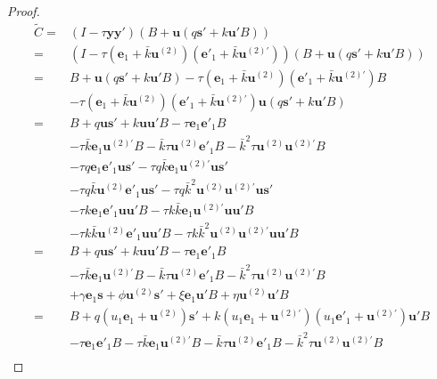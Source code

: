 \documentclass{article}
\begin{document}
\begin{proof}
\begin{equation}
    \begin{aligned}
        \tilde{C}=&(I-\tau\mathbf{y}\mathbf{y}')(B+\mathbf{u}(q\mathbf{s}'+k\mathbf{u}'B))\\
        =&(I-\tau(\mathbf{e}_1+\bar{k}\mathbf{u}^{(2)})(\mathbf{e'}_1+\bar{k}\mathbf{u}^{(2)'}))(B+\mathbf{u}(q\mathbf{s}'+k\mathbf{u}'B))\\
        =&B+\mathbf{u}(q\mathbf{s}'+k\mathbf{u}'B)-\tau(\mathbf{e}_1+\bar{k}\mathbf{u}^{(2)})(\mathbf{e'}_1+\bar{k}\mathbf{u}^{(2)'})B\\
        &-\tau(\mathbf{e}_1+\bar{k}\mathbf{u}^{(2)})(\mathbf{e'}_1+\bar{k}\mathbf{u}^{(2)'})\mathbf{u}(q\mathbf{s}'+k\mathbf{u}'B)\\
        =&B+q\mathbf{u}\mathbf{s}'+k\mathbf{u}\mathbf{u}'B-\tau\mathbf{e}_1\mathbf{e'}_1B\\
        &-\tau\bar{k}\mathbf{e}_1\mathbf{u}^{(2)'}B-\bar{k}\tau \mathbf{u}^{(2)}\mathbf{e'}_1B-\bar{k}^2\tau\mathbf{u}^{(2)}\mathbf{u}^{(2)'}B\\
        &-\tau q\mathbf{e}_1\mathbf{e'}_1\mathbf{u}\mathbf{s'}-\tau q\bar{k}\mathbf{e}_1\mathbf{u}^{(2)'}\mathbf{u}\mathbf{s}'\\
        &-\tau q\bar{k}\mathbf{u}^{(2)}\mathbf{e'}_1\mathbf{u}\mathbf{s}'-\tau q\bar{k}^2\mathbf{u}^{(2)}\mathbf{u}^{(2)'}\mathbf{u}\mathbf{s}'\\
        &-\tau k\mathbf{e}_1\mathbf{e'}_1\mathbf{u}\mathbf{u}'B-\tau k\bar{k}\mathbf{e}_1\mathbf{u}^{(2)'}\mathbf{u}\mathbf{u}'B\\&-\tau k\bar{k}\mathbf{u}^{(2)}\mathbf{e'}_1\mathbf{u}\mathbf{u}'B-\tau k\bar{k}^2\mathbf{u}^{(2)}\mathbf{u}^{(2)'}\mathbf{u}\mathbf{u}'B\\
        =&B+q\mathbf{u}\mathbf{s}'+k\mathbf{u}\mathbf{u}'B-\tau\mathbf{e}_1\mathbf{e'}_1B\\
        &-\tau\bar{k}\mathbf{e}_1\mathbf{u}^{(2)'}B-\bar{k}\tau \mathbf{u}^{(2)}\mathbf{e'}_1B-\bar{k}^2\tau\mathbf{u}^{(2)}\mathbf{u}^{(2)'}B\\
        &+\gamma \mathbf{e}_1\mathbf{s}+\phi \mathbf{u}^{(2)}\mathbf{s}'+\xi\mathbf{e}_1\mathbf{u}'B+\eta\mathbf{u}^{(2)}\mathbf{u}'B\\
        =&B+q(u_1\mathbf{e}_1+\mathbf{u}^{(2)})\mathbf{s}'+k(u_1\mathbf{e}_1+\mathbf{u}^{(2)'})(u_1\mathbf{e'}_1+\mathbf{u}^{(2)'})\mathbf{u}'B\\
        &-\tau\mathbf{e}_1\mathbf{e'}_1B-\tau\bar{k}\mathbf{e}_1\mathbf{u}^{(2)'}B-\bar{k}\tau \mathbf{u}^{(2)}\mathbf{e'}_1B-\bar{k}^2\tau\mathbf{u}^{(2)}\mathbf{u}^{(2)'}B\\

\end{aligned}
\end{equation}
\end{proof}
\end{document}

